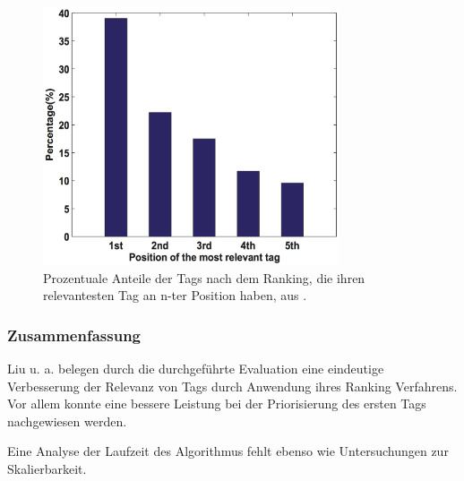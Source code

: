\begin{figure}[htbp]
  \centering
    \includegraphics[height=3in]{images/positionRelevantTags.png}
  \caption{Prozentuale Anteile der Tags nach dem Ranking, die ihren relevantesten Tag an n-ter Position haben, aus \cite{ranking}.}
  \label{fig:images_positionRelevantTags}
\end{figure}



\subsubsection*{Zusammenfassung} %
\label{ssub:zusammenfassung_und_bewertung_liu}
Liu u. a. belegen durch die durchgeführte Evaluation eine eindeutige Verbesserung der Relevanz von Tags durch Anwendung ihres Ranking Verfahrens. Vor allem konnte eine bessere Leistung bei der Priorisierung des ersten Tags nachgewiesen werden. 

Eine Analyse der Laufzeit des Algorithmus fehlt ebenso wie Untersuchungen zur Skalierbarkeit. 



